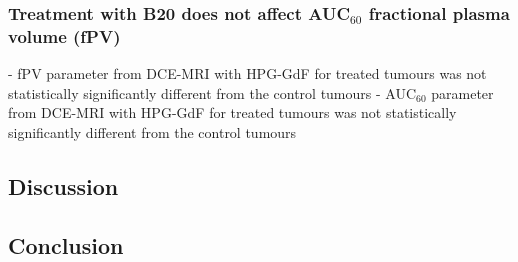 \subsubsection{Treatment with B20 does not affect AUC$_60$ fractional plasma volume (fPV)}

- fPV parameter from DCE-MRI with \ac{HPG-GdF} for treated tumours was not statistically significantly different from the control tumours
- AUC$_60$ parameter from DCE-MRI with \ac{HPG-GdF} for treated tumours was not statistically significantly different from the control tumours


\subsubsection{}

\subsection{Discussion}

\subsection{Conclusion}

\endinput
